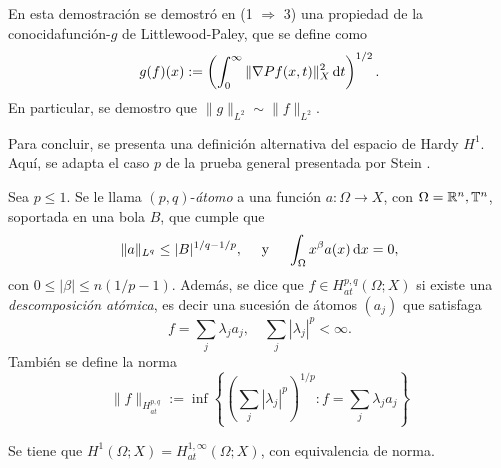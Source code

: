 \begin{remark}
	En esta demostración se demostró en (1 $\Rightarrow$ 3) una propiedad de la conocidafunción-$g$ de Littlewood-Paley, que se define como 
	\begin{equation*}
		g(f)(x) := \left(\int_0^\infty \|\nabla Pf(x, t)\|_X^2 \mathop{}\!\mathrm{d} t\right)^{1/2}.
	\end{equation*}
	En particular, se demostro que $\|g\|_{L^2} \sim \|f\|_{L^2}$.
\end{remark}
Para concluir, se presenta una definición alternativa del espacio de Hardy $H^1$. Aquí, se adapta el caso $p$ de la prueba general presentada por Stein \cite{stein}.
\begin{definition}
	Sea $p\leq 1$. Se le llama $(p,q)$-\textit{átomo} a una función $a:\Omega\to X$, con $\Omega=\mathbb{R}^n,\mathbb{T}^n$, soportada en una bola $B$, que cumple que 
	\begin{equation*}
		\|a\|_{L^q} \leq |B|^{1/q-1/p}, \quad \text{ y } \quad \int_{\Omega}x^\beta a(x) \mathop{}\!\mathrm{d} x = 0,
	\end{equation*}
	con $0\leq|\beta|\leq n(1/p-1)$.
	Además, se dice que $f\in H^{p,q}_{at}(\Omega;X)$ si existe una \textit{descomposición atómica}, es decir una sucesión de átomos $(a_j)$ que satisfaga
	\begin{equation*}
		f = \sum_j \lambda_j a_j, \quad \sum_j |\lambda_j|^p < \infty.
	\end{equation*}
	También se define la norma 
	\begin{equation*}
		\|f\|_{H^{p,q}_{at}} := \inf \left\{\left(\sum_j |\lambda_j|^p\right)^{1/p} : f=\sum_j\lambda_j a_j \right\}
	\end{equation*}
\end{definition}
\begin{theorem}
	Se tiene que $H^1(\Omega;X) = H^{1,\infty}_{at}(\Omega;X)$, con equivalencia de norma.
\end{theorem}
